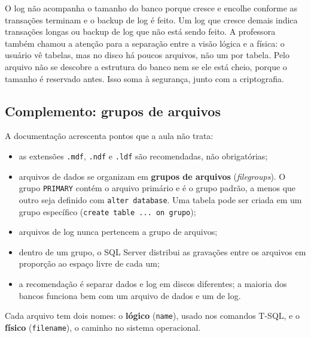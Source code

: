 O log não acompanha o tamanho do banco porque cresce e encolhe conforme
as transações terminam e o backup de log é feito. Um log que cresce
demais indica transações longas ou backup de log que não está sendo
feito. A professora também chamou a atenção para a separação entre a
visão lógica e a física: o usuário vê tabelas, mas no disco há poucos
arquivos, não um por tabela. Pelo arquivo não se descobre a estrutura do
banco nem se ele está cheio, porque o tamanho é reservado antes. Isso
soma à segurança, junto com a criptografia.

\subsection*{Complemento: grupos de arquivos}

A documentação acrescenta pontos que a aula
não trata:

\begin{itemize}
	\item as extensões \texttt{.mdf}, \texttt{.ndf} e \texttt{.ldf} são
	recomendadas, não obrigatórias;
	\item arquivos de dados se organizam em \textbf{grupos de arquivos}
	(\emph{filegroups}). O grupo \texttt{PRIMARY} contém o
	arquivo primário e é o grupo padrão, a menos que outro seja definido
	com \texttt{alter database}. Uma tabela pode ser criada em um grupo
	específico (\texttt{create table ... on grupo});
	\item arquivos de log nunca pertencem a grupo de arquivos;
	\item dentro de um grupo, o SQL Server distribui as gravações entre os
	arquivos em proporção ao espaço livre de cada um;
	\item a recomendação é separar dados e log em discos diferentes; a
	maioria dos bancos funciona bem com um arquivo de dados e um de log.
\end{itemize}

Cada arquivo tem dois nomes: o \textbf{lógico} (\texttt{name}), usado nos
comandos T-SQL, e o \textbf{físico} (\texttt{filename}), o caminho no
sistema operacional.

